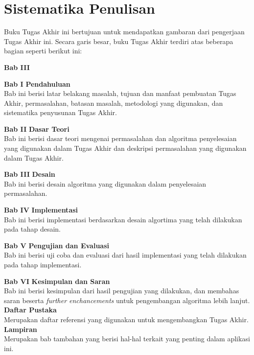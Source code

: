     \section{Sistematika Penulisan}	
	    Buku Tugas Akhir ini bertujuan untuk mendapatkan gambaran dari pengerjaan Tugas Akhir ini. Secara garis besar, buku Tugas Akhir terdiri atas beberapa bagian seperti berikut ini:
	    \begin{labeling}{\textbf{Bab III}}
	    	\item[\textbf{Bab I}] 
		    	\textbf{Pendahuluan}\\
				Bab ini berisi latar belakang masalah, tujuan dan manfaat pembuatan Tugas Akhir, permasalahan, batasan masalah, metodologi yang digunakan, dan sistematika penyusunan Tugas Akhir. 
	    	\item[\textbf{Bab II}] \textbf{Dasar Teori} \\
		    	Bab ini berisi dasar teori mengenai permasalahan dan algoritma penyelesaian yang digunakan dalam Tugas Akhir dan deskripsi permasalahan yang digunakan dalam Tugas Akhir.
	    	\item[\textbf{Bab III}] \textbf{Desain} \\ 
		    	Bab ini berisi desain algoritma yang digunakan dalam penyelesaian permasalahan.
	    	\item[\textbf{Bab IV}] \textbf{Implementasi} \\
		    	Bab ini berisi implementasi berdasarkan desain algortima yang telah dilakukan pada tahap desain.	
	    	\item[\textbf{Bab V}] \textbf{Pengujian dan Evaluasi} \\
		    	Bab ini berisi uji coba dan evaluasi dari hasil implementasi yang telah dilakukan pada tahap implementasi.
	    	\item[\textbf{Bab VI}] 	\textbf{Kesimpulan dan Saran}\\
    	Bab ini berisi kesimpulan dari hasil pengujian yang dilakukan, dan membahas saran beserta \textit{further enchancements} untuk pengembangan algoritma lebih lanjut. \\
\textbf{Daftar Pustaka}\\
Merupakan daftar referensi yang digunakan untuk mengembangkan Tugas Akhir.\\
		\textbf{Lampiran}\\
		Merupakan bab tambahan yang berisi hal-hal terkait yang penting dalam aplikasi ini.
		\end{labeling}